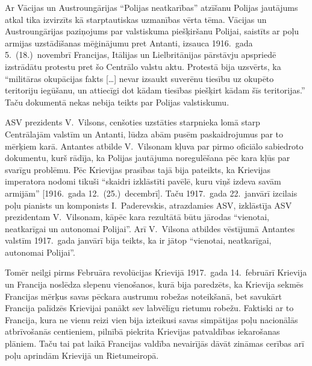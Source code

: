 \documentclass[twoside,a5paper,12pt,fleqn,openany]{extbook}
\newcommand{\citespace}{[\dots{}]}
\begin{document}
Ar Vācijas un Austroungārijas ``Polijas neatkarības'' atzīšanu Polijas jautājums atkal tika izvirzīts kā starptautiskas uzmanības vērta tēma. Vācijas un Austroungārijas paziņojums par valstiskuma piešķiršanu Polijai, saistīts ar poļu armijas uzstādīšanas mēģinājumu pret Antanti, izsauca 1916.~gada 5.~(18.)~novembrī Francijas, Itālijas un Lielbritānijas pārstāvju apspriedē izstrādātu protestu pret šo Centrālo valstu aktu. Protestā bija uzsvērts, ka ``militāras okupācijas fakts \citespace{} nevar izsaukt suverēnu tiesību uz okupēto teritoriju iegūšanu, un attiecīgi dot kādam tiesības piešķirt kādam šīs teritorijas.'' Taču dokumentā nekas nebija teikts par Polijas valstiskumu.

ASV prezidents V.~Vilsons, cenšoties uzstāties starpnieka lomā starp Centrālajām valstīm un Antanti, lūdza abām pusēm paskaidrojumus par to mērķiem karā. Antantes atbilde V.~Vilsonam kļuva par pirmo oficiālo sabiedroto dokumentu, kurš rādīja, ka Polijas jautājuma noregulēšana pēc kara kļūs par svarīgu problēmu. Pēc Krievijas prasības tajā bija pateikts, ka Krievijas imperatora nodomi tikuši ``skaidri izklāstīti pavēlē, kuru viņš izdeva savām armijām'' [1916.~gada 12.~(25.)~decembrī]. Taču 1917.~gada 22.~janvārī izcilais poļu pianists un komponists I.~Paderevskis, atrazdamies ASV, izklāstīja ASV prezidentam V.~Vilsonam, kāpēc kara rezultātā būtu jārodas ``vienotai, neatkarīgai un autonomai Polijai''. Arī V.~Vilsona atbildes vēstījumā Antantes valstīm 1917.~gada janvārī bija teikts, ka ir jātop ``vienotai, neatkarīgai, autonomai Polijai''.

Tomēr neilgi pirms Februāra revolūcijas Krievijā 1917.~gada 14.~februārī Krievija un Francija noslēdza slepenu vienošanos, kurā bija paredzēts, ka Krievija sekmēs Francijas mērķus savas pēckara austrumu robežas noteikšanā, bet savukārt Francija palīdzēs Krievijai panākt sev labvēlīgu rietumu robežu. Faktiski ar to Francija, kura ne vienu reizi vien bija izteikusi savas simpātijas poļu nacionālās atbrīvošanās centieniem, pilnībā piekrita Krievijas patvaldības iekarošanas plāniem. Taču tai pat laikā Francijas valdība nevairījās dāvāt zināmas cerības arī poļu aprindām Krievijā un Rietumeiropā.
\end{document}
